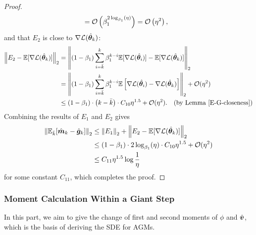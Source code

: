 \begin{proof}
\begin{align*}
        &= \mathcal{O}\left( \beta_1 ^ {2\log_{\beta_1}(\eta)} \right) = \mathcal{O}\left( \eta^2 \right),
    \end{align*}
    and that $E_2$ is close to $\nabla\mathcal{L}(\hat{{\bm{\theta}}}_{k})$:
    \begin{align*}
        \left\|E_2 - \mathbb{E}[\nabla\mathcal{L}(\hat{{\bm{\theta}}}_{k})]\right\|_2 &= \left\|(1-\beta_1)\sum_{i=\Bar{k}}^{k}\beta_1^{k-i}\mathbb{E}[\nabla \mathcal{L}(\hat{{\bm{\theta}}}_{i})] - \mathbb{E}[\nabla \mathcal{L}(\hat{{\bm{\theta}}}_{k})]\right\|_2 \\
        &= \left\|(1-\beta_1)\sum_{i=\Bar{k}}^{k}\beta_1^{k-i}\mathbb{E}\left[\nabla \mathcal{L}(\hat{{\bm{\theta}}}_{i}) - \nabla \mathcal{L}(\hat{{\bm{\theta}}}_{k})\right]\right\|_2 + \mathcal{O}(\eta^2) \\
        &\leq  (1-\beta_1) \cdot \left(k - \Bar{k}\right) \cdot C_{10} \eta^{1.5} + \mathcal{O}(\eta^2). \quad \text{(by Lemma \ref{E-G-closeness})} \\
    \end{align*}
    Combining the results of $E_1$ and $E_2$ gives
    \begin{align*}
        \left\|\mathbb{E}_{\Bar{k}}[\hat{{\bm{m}}}_k - \hat{{\bm{g}}}_k]\right\|_2 &\leq \left\|E_1\right\|_2 + \left\|E_2 - \mathbb{E}[\nabla\mathcal{L}(\hat{{\bm{\theta}}}_{k})]\right\|_2 \\
        &\leq (1-\beta_1) \cdot 2\log_{\beta_1}(\eta) \cdot C_{10} \eta^{1.5} + \mathcal{O}(\eta^2) \\
        & \leq C_{11} \eta^{1.5}\log\frac{1}{\eta}
    \end{align*}
    for some constant $C_{11}$, which completes the proof.
\end{proof}

\subsubsection{Moment Calculation Within a Giant Step}
In this part, we aim to give the change of first and second moments of $\phi$ and $\hat{{\bm{v}}}$, which is the basis of deriving the SDE for AGMs.

